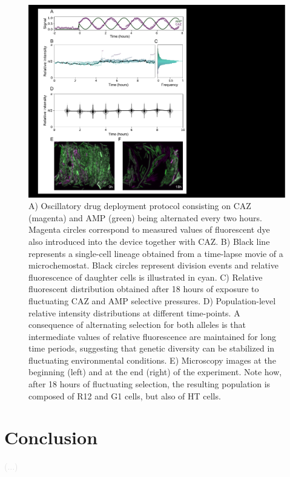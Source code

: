 \documentclass[fleqn,12pt]{wlscirep}
\newcommand{\doing}[1]{\textcolor{gray}{#1}}
\newcommand{\todo}[1]{\textcolor{gainsboro}{#1}}
\begin{document}

\begin{figure}[h!]
\centering
    \includegraphics[width=0.7\linewidth]{figures/Figure5.pdf}
\caption{ \small{A) Oscillatory drug deployment protocol consisting on CAZ (magenta) and AMP (green) being alternated every two hours. Magenta circles correspond to measured values of fluorescent dye also introduced into the device together with CAZ.  B) Black line represents a single-cell lineage obtained from a time-lapse movie of a microchemostat.  Black circles represent division events and relative fluorescence of daughter cells is illustrated in cyan.  C) Relative fluorescent distribution obtained after 18 hours of exposure to fluctuating CAZ and AMP selective pressures.  D) Population-level relative intensity distributions at different time-points.  A consequence of alternating selection for both alleles is that intermediate values of relative fluorescence are maintained for long time periods, suggesting that genetic diversity can be stabilized in fluctuating environmental conditions. E) Microscopy images at the beginning (left) and at the end (right) of the experiment. Note how, after 18 hours of fluctuating selection, the resulting population is composed of R12 and G1 cells, but also of HT cells.}}
\label{fig:sine}
\end{figure}


\clearpage
\section{Conclusion}
\todo{(...)}


\end{document}
